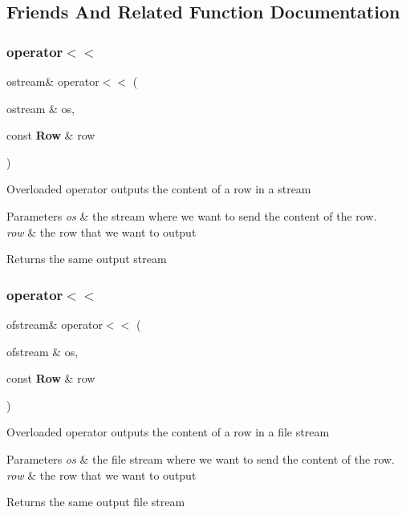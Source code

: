 \subsection{Friends And Related Function Documentation}
\mbox{\label{class_row_a8962fdc6373687757234a811e803a1da}} 
\subsubsection{operator$<$$<$\hspace{0.1cm}{\footnotesize\ttfamily [1/2]}}
{\footnotesize\ttfamily ostream\& operator$<$$<$ (\begin{DoxyParamCaption}\item[{ostream \&}]{os,  }\item[{const \textbf{ Row} \&}]{row }\end{DoxyParamCaption})\hspace{0.3cm}{\ttfamily [friend]}}

Overloaded operator outputs the content of a row in a stream 
\begin{DoxyParams}{Parameters}
{\em os} & the stream where we want to send the content of the row. \\
\hline
{\em row} & the row that we want to output \\
\hline
\end{DoxyParams}
\begin{DoxyReturn}{Returns}
the same output stream 
\end{DoxyReturn}
\mbox{\label{class_row_ad4e8b6c4b0238a50bde8e99ec8a0dcb0}} 
\subsubsection{operator$<$$<$\hspace{0.1cm}{\footnotesize\ttfamily [2/2]}}
{\footnotesize\ttfamily ofstream\& operator$<$$<$ (\begin{DoxyParamCaption}\item[{ofstream \&}]{os,  }\item[{const \textbf{ Row} \&}]{row }\end{DoxyParamCaption})\hspace{0.3cm}{\ttfamily [friend]}}

Overloaded operator outputs the content of a row in a file stream 
\begin{DoxyParams}{Parameters}
{\em os} & the file stream where we want to send the content of the row. \\
\hline
{\em row} & the row that we want to output \\
\hline
\end{DoxyParams}
\begin{DoxyReturn}{Returns}
the same output file stream 
\end{DoxyReturn}


